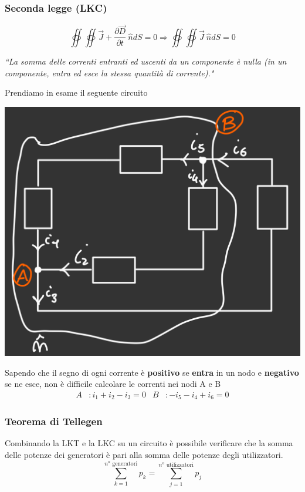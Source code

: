 \documentclass{article}
\begin{document}
\subsubsection{Seconda legge (LKC)}
\[
    \oiint \oiint \vec J + \dfrac{\partial \vec D}{\partial t} \ \hat n dS = 0 \Longrightarrow \oiint \oiint \vec J \ \hat n dS = 0
\]
\begin{center}
    \textit{“La somma delle correnti entranti ed uscenti da un componente è nulla (in un
componente, entra ed esce la stessa quantità di corrente)."}
\end{center}
Prendiamo in esame il seguente circuito
\begin{center}
    \includegraphics[scale=0.25]{Image/Esempio LKC.png}
\end{center}
Sapendo che il segno di ogni corrente è \textbf{positivo} se \textbf{entra} in un nodo e \textbf{negativo} se ne esce, non è difficile calcolare le correnti nei nodi A e B 
\begin{align*}
    A&: i_1 + i_2 - i_3=0 & B&: -i_5-i_4+i_6=0
\end{align*}


\subsubsection{Teorema di Tellegen}
Combinando la LKT e la LKC su un circuito è possibile verificare che la somma delle potenze dei generatori è pari alla somma delle potenze degli utilizzatori.
\[
    \sum_{k=1}^{n^o \text{ generatori}} p_k = \sum_{j=1}^{n^o \text{ utilizzatori}} p_j
\]
\end{document}
